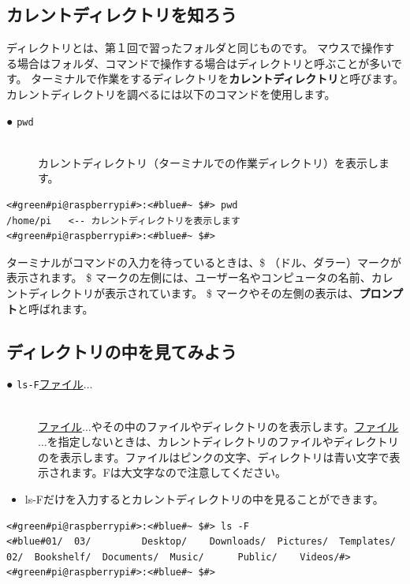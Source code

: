 \documentclass[text03.tex]{subfiles}
\begin{document}
\subsection{カレントディレクトリを知ろう}
ディレクトリとは、第１回で習ったフォルダと同じものです。
マウスで操作する場合はフォルダ、コマンドで操作する場合はディレクトリと呼ぶことが多いです。
ターミナルで作業をするディレクトリを{\bf カレントディレクトリ}と呼びます。
カレントディレクトリを調べるには以下のコマンドを使用します。

\begin{description}
\item[● \texttt{pwd}]\mbox{}\\
 カレントディレクトリ（ターミナルでの作業ディレクトリ）を表示します。
\end{description}

\begin{lstlisting}[caption=pwdコマンドの例,label=pwdtest]
<#green#pi@raspberrypi#>:<#blue#~ $#> pwd
/home/pi   <-- カレントディレクトリを表示します
<#green#pi@raspberrypi#>:<#blue#~ $#>
\end{lstlisting}

ターミナルがコマンドの入力を待っているときは、\$ （ドル、ダラー）マークが表示されます。
\$ マークの左側には、ユーザー名やコンピュータの名前、カレントディレクトリが表示されています。
\$ マークやその左側の表示は、{\bf プロンプト}と呼ばれます。

\subsection{ディレクトリの中を見てみよう}
\begin{description}
\item[● \texttt{ls}\textvisiblespace \texttt{-F}\textvisiblespace \underline{ファイル}$\ldots$]\mbox{}\\
\underline{ファイル}$\ldots$やその中のファイルやディレクトリのを表示します。\underline{ファイル}$\ldots$を指定しないときは、カレントディレクトリのファイルやディレクトリのを表示します。ファイルはピンクの文字、ディレクトリは青い文字で表示されます。Fは大文字なので注意してください。
\end{description}
\begin{itemize}
  \item[<例>] ls\textvisiblespace -Fだけを入力するとカレントディレクトリの中を見ることができます。
\end{itemize}

\begin{lstlisting}[caption=ls -F コマンドの例。ファイルやディレクトリが表示されます,label=lsFtest]
<#green#pi@raspberrypi#>:<#blue#~ $#> ls -F
<#blue#01/  03/         Desktop/    Downloads/  Pictures/  Templates/
02/  Bookshelf/  Documents/  Music/      Public/    Videos/#>
<#green#pi@raspberrypi#>:<#blue#~ $#>
\end{lstlisting}
\end{document}
